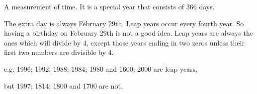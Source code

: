 A measurement of time.  
It is a special year that consists of 366 days.  
\par
The extra day is always February 29th.  Leap years occur every fourth year.  
So having a birthday on February 29th is not a good idea. 
Leap years are always the ones which will divide by 4, 
except those years ending in two zeros unless their first two numbers are divisible 
by 4.

\par
e.g. 1996; 1992; 1988; 1984; 1980 and 1600; 2000 are leap years, 
\par
but 1997; 1814; 1800 and 1700 are not.